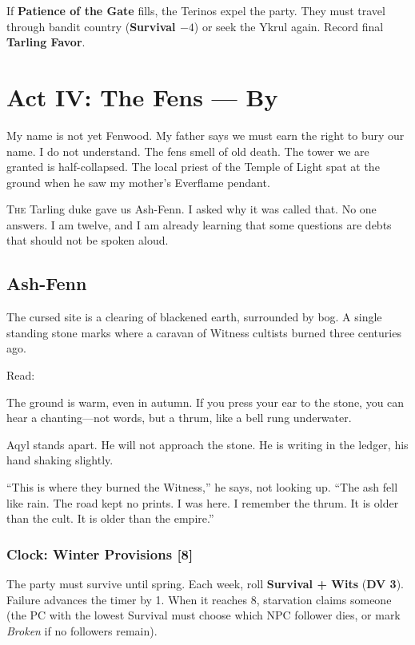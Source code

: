 \documentclass[11pt,a5paper]{book}
\newcommand{\dv}[1]{\textbf{DV #1}}
\newcommand{\timer}[1]{\textbf{[#1]}}
\newcommand{\condition}[1]{\textit{#1}}
\begin{document}
If \textbf{Patience of the Gate} fills, the Terinos expel the party. They must travel through bandit country (\textbf{Survival $-4$}) or seek the Ykrul again. Record final \textbf{Tarling Favor}.

\clearpage

\chapter{Act IV: The Fens --- By \heir}

\epigraph{My name is not yet Fenwood. My father says we must earn the right to bury our name. I do not understand. The fens smell of old death. The tower we are granted is half-collapsed. The local priest of the Temple of Light spat at the ground when he saw my mother's Everflame pendant.}{\heir}

\lettrine{T}{he} Tarling duke gave us Ash-Fenn. I asked why it was called that. No one answers. I am twelve, and I am already learning that some questions are debts that should not be spoken aloud.

\section*{Ash-Fenn}

The cursed site is a clearing of blackened earth, surrounded by bog. A single standing stone marks where a caravan of Witness cultists burned three centuries ago.

Read:
\begin{quoting}
The ground is warm, even in autumn. If you press your ear to the stone, you can hear a chanting---not words, but a thrum, like a bell rung underwater. 

Aqyl stands apart. He will not approach the stone. He is writing in the ledger, his hand shaking slightly. 

``This is where they burned the Witness,'' he says, not looking up. ``The ash fell like rain. The road kept no prints. I was here. I remember the thrum. It is older than the cult. It is older than the empire.''
\end{quoting}

\subsection*{Clock: Winter Provisions \timer{8}}

The party must survive until spring. Each week, roll \textbf{Survival + Wits} (\dv{3}). Failure advances the timer by 1. When it reaches 8, starvation claims someone (the PC with the lowest Survival must choose which NPC follower dies, or mark \condition{Broken} if no followers remain).
\end{document}
